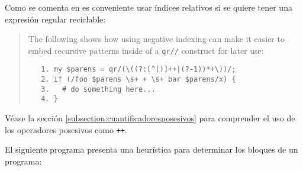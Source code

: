 Como se comenta en  es conveniente usar 
índices relativos si se quiere tener una expresión regular reciclable:

\begin{it}
\begin{quotation}
The following shows how using negative indexing can make it easier to
embed recursive patterns inside of a \verb|qr//| construct for later use:

\begin{verbatim}
   1. my $parens = qr/(\((?:[^()]++|(?-1))*+\))/;
   2. if (/foo $parens \s+ + \s+ bar $parens/x) {
   3.   # do something here...
   4. }
\end{verbatim}
\end{quotation} 
\end{it}
Véase la sección 
\ref{subsection:cuantificadoresposesivos}
para comprender el uso de los operadores posesivos como \verb|++|.

\label{parrafo:bloquesanidados}

El siguiente programa presenta una heurística 
para determinar los bloques de un programa:

